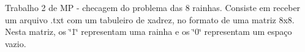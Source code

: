 Trabalho 2 de MP -\/ checagem do problema das 8 rainhas. Consiste em receber um arquivo .txt com um tabuleiro de xadrez, no formato de uma matriz 8x8. Nesta matriz, os \char`\"{}1\char`\"{} representam uma rainha e os \char`\"{}0\char`\"{} representam um espaço vazio. 